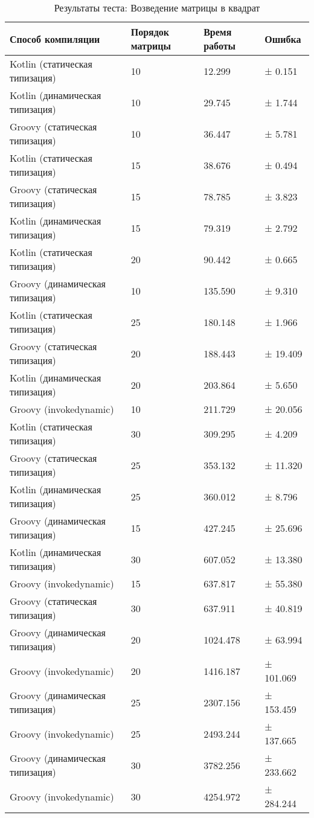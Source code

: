     \begin{table}[h]
\caption{\label{tab:matrixSquareBenchResults}Результаты теста: Возведение матрицы в квадрат}
\begin{center}
\begin{tabular}{|l|p{}|l|l|}
\hline
Способ компиляции & Порядок матрицы	& Время работы & Ошибка \\
\hline
Kotlin (статическая типизация)     & 10 &   12.299 & ±   0.151\\
Kotlin (динамическая типизация)    & 10 &   29.745 & ±   1.744\\
Groovy (статическая типизация)     & 10 &   36.447 & ±   5.781\\
Kotlin (статическая типизация)     & 15 &   38.676 & ±   0.494\\
Groovy (статическая типизация)     & 15 &   78.785 & ±   3.823\\
Kotlin (динамическая типизация)    & 15 &   79.319 & ±   2.792\\
Kotlin (статическая типизация)     & 20 &   90.442 & ±   0.665\\
Groovy (динамическая типизация)    & 10 &  135.590 & ±   9.310\\
Kotlin (статическая типизация)     & 25 &  180.148 & ±   1.966\\
Groovy (статическая типизация)     & 20 &  188.443 & ±  19.409\\
Kotlin (динамическая типизация)    & 20 &  203.864 & ±   5.650\\
Groovy (invokedynamic)             & 10 &  211.729 & ±  20.056\\
Kotlin (статическая типизация)     & 30 &  309.295 & ±   4.209\\
Groovy (статическая типизация)     & 25 &  353.132 & ±  11.320\\
Kotlin (динамическая типизация)    & 25 &  360.012 & ±   8.796\\
Groovy (динамическая типизация)    & 15 &  427.245 & ±  25.696\\
Kotlin (динамическая типизация)    & 30 &  607.052 & ±  13.380\\
Groovy (invokedynamic)             & 15 &  637.817 & ±  55.380\\
Groovy (статическая типизация)     & 30 &  637.911 & ±  40.819\\
Groovy (динамическая типизация)    & 20 & 1024.478 & ±  63.994\\
Groovy (invokedynamic)             & 20 & 1416.187 & ± 101.069\\
Groovy (динамическая типизация)    & 25 & 2307.156 & ± 153.459\\
Groovy (invokedynamic)             & 25 & 2493.244 & ± 137.665\\
Groovy (динамическая типизация)    & 30 & 3782.256 & ± 233.662\\
Groovy (invokedynamic)             & 30 & 4254.972 & ± 284.244\\
\hline
\end{tabular}
\end{center}
\end{table} 


